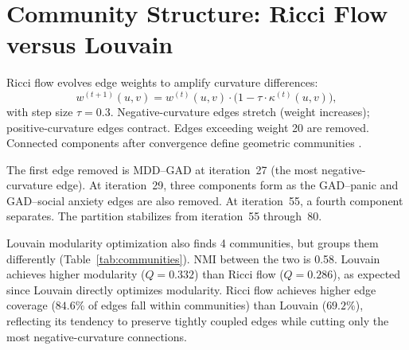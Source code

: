 \documentclass{article}
\begin{document}
\section{Community Structure: Ricci Flow versus Louvain}
\label{sec:communities}

Ricci flow evolves edge weights to amplify curvature differences:
\begin{equation}
  w^{(t+1)}(u, v) = w^{(t)}(u, v) \cdot \bigl(1 - \tau \cdot \kappa^{(t)}(u, v)\bigr),
\end{equation}
with step size $\tau = 0.3$. Negative-curvature edges stretch (weight increases); positive-curvature edges contract. Edges exceeding weight 20 are removed. Connected components after convergence define geometric communities \citep{ni2015ricci}.

The first edge removed is MDD--GAD at iteration~27 (the most negative-curvature edge). At iteration~29, three components form as the GAD--panic and GAD--social anxiety edges are also removed. At iteration~55, a fourth component separates. The partition stabilizes from iteration~55 through~80.

Louvain modularity optimization \citep{blondel2008fast} also finds 4 communities, but groups them differently (Table~\ref{tab:communities}). NMI between the two is 0.58. Louvain achieves higher modularity ($Q = 0.332$) than Ricci flow ($Q = 0.286$), as expected since Louvain directly optimizes modularity. Ricci flow achieves higher edge coverage ($84.6\%$ of edges fall within communities) than Louvain ($69.2\%$), reflecting its tendency to preserve tightly coupled edges while cutting only the most negative-curvature connections.
\end{document}
